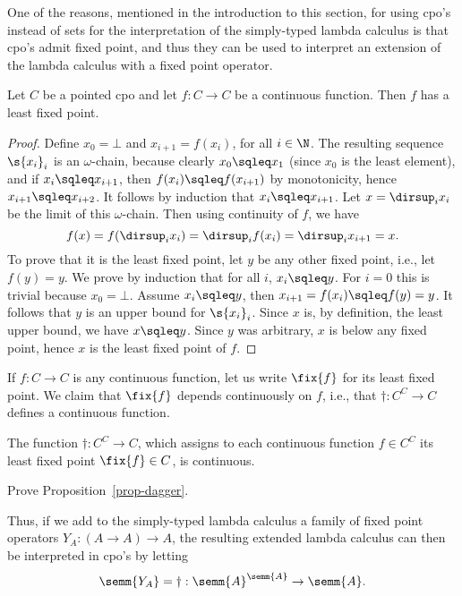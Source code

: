 \documentclass[12pt]{article}
\begin{document}
One of the reasons, mentioned in the introduction to this section, for
using cpo's instead of sets for the interpretation of the simply-typed
lambda calculus is that cpo's admit fixed point, and thus they can be
used to interpret an extension of the lambda calculus with a fixed point
operator. 

\begin{proposition}
  Let $C$ be a pointed cpo and let $f:C\to C$ be a continuous
  function. Then $f$ has a least fixed point.
\end{proposition}

\begin{proof}
  Define $x_0=\bot$ and $x_{i+1} = f(x_i)$, for all $i\in\N$. The
  resulting sequence $\s{x_i}_i$ is an $\omega$-chain, because clearly
  $x_0\sqleq x_1$ (since $x_0$ is the least element), and if
  $x_{i}\sqleq x_{i+1}$, then $f(x_{i})\sqleq f(x_{i+1})$ by
  monotonicity, hence $x_{i+1}\sqleq x_{i+2}$. It follows by induction
  that $x_{i}\sqleq x_{i+1}$. Let $x=\dirsup_i x_i$ be the limit of
  this $\omega$-chain. Then using continuity of $f$, we have
  \[ f(x) = f(\dirsup_i x_i) = \dirsup_i f(x_i) = \dirsup_i x_{i+1} =
  x.
  \]
  To prove that it is the least fixed point, let $y$ be any other
  fixed point, i.e., let $f(y)=y$. We prove by induction that for all
  $i$, $x_i\sqleq y$. For $i=0$ this is trivial because $x_0=\bot$.
  Assume $x_i\sqleq y$, then $x_{i+1}=f(x_{i})\sqleq f(y)=y$. It
  follows that $y$ is an upper bound for $\s{x_i}_i$. Since $x$ is, by
  definition, the least upper bound, we have $x\sqleq y$. Since $y$
  was arbitrary, $x$ is below any fixed point, hence $x$ is the least
  fixed point of $f$.\eot
\end{proof}

If $f:C\to C$ is any continuous function, let us write $\fix{f}$ for
its least fixed point. We claim that $\fix{f}$ depends continuously on
$f$, i.e., that $\dagger:C^C\to C$ defines a continuous function. 

\begin{proposition}\label{prop-dagger}
  The function $\dagger:C^C\to C$, which assigns to each continuous
  function $f\in C^C$ its least fixed point $\fix{f}\in C$, is
  continuous. 
\end{proposition}

\begin{exercise}
  Prove Proposition~\ref{prop-dagger}.
\end{exercise}

Thus, if we add to the simply-typed lambda calculus a family of
fixed point operators $Y_A:(A\to A)\to A$, the resulting extended lambda
calculus can then be interpreted in cpo's by letting
\[  \semm{Y_A} = \dagger:\semm{A}^{\semm{A}} \to \semm{A}.
\]
\end{document}
